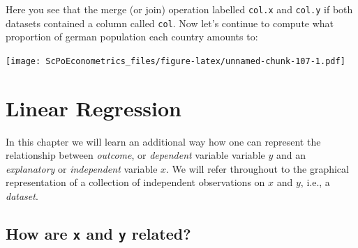 \documentclass[]{book}
\newenvironment{Shaded}{\begin{snugshade}}{\end{snugshade}}
\newcommand{\KeywordTok}[1]{\textcolor[rgb]{0.13,0.29,0.53}{\textbf{#1}}}
\newcommand{\DataTypeTok}[1]{\textcolor[rgb]{0.13,0.29,0.53}{#1}}
\newcommand{\DecValTok}[1]{\textcolor[rgb]{0.00,0.00,0.81}{#1}}
\newcommand{\StringTok}[1]{\textcolor[rgb]{0.31,0.60,0.02}{#1}}
\newcommand{\CommentTok}[1]{\textcolor[rgb]{0.56,0.35,0.01}{\textit{#1}}}
\newcommand{\OperatorTok}[1]{\textcolor[rgb]{0.81,0.36,0.00}{\textbf{#1}}}
\newcommand{\NormalTok}[1]{#1}
\theoremstyle{definition}
\theoremstyle{definition}
\theoremstyle{definition}
\theoremstyle{remark}
\begin{document}
Here you see that the merge (or join) operation labelled \texttt{col.x}
and \texttt{col.y} if both datasets contained a column called
\texttt{col}. Now let's continue to compute what proportion of german
population each country amounts to:

\begin{Shaded}
\end{Shaded}

\texttt{[image: ScPoEconometrics\_files/figure-latex/unnamed-chunk-107-1.pdf]}

\chapter{Linear Regression}\label{linreg}

In this chapter we will learn an additional way how one can represent
the relationship between \emph{outcome}, or \emph{dependent} variable
variable \(y\) and an \emph{explanatory} or \emph{independent} variable
\(x\). We will refer throughout to the graphical representation of a
collection of independent observations on \(x\) and \(y\), i.e., a
\emph{dataset}.

\section{\texorpdfstring{How are \texttt{x} and \texttt{y}
related?}{How are x and y related?}}\label{how-are-x-and-y-related}
\end{document}
